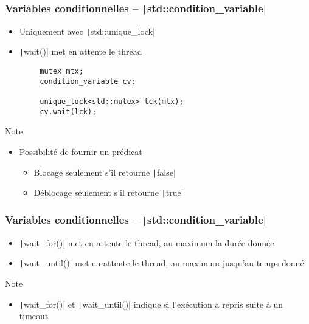 \documentclass[C++.tex]{subfiles}
\begin{document}
\begin{frame}[fragile]
	\frametitle{Variables conditionnelles -- \texttt|std::condition_variable|}
	\begin{itemize}
		\item Uniquement avec \texttt|std::unique_lock|
		\item \texttt|wait()| met en attente le thread
	\end{itemize}

	\begin{verbatim}
		mutex mtx;
		condition_variable cv;

		unique_lock<std::mutex> lck(mtx);
		cv.wait(lck);
	\end{verbatim}

	\begin{block}{Note}
		\begin{itemize}
			\item Possibilité de fournir un prédicat
			\begin{itemize}
				\item Blocage seulement s'il retourne \texttt|false|
				\item Déblocage seulement s'il retourne \texttt|true|
			\end{itemize}
		\end{itemize}
	\end{block}
\end{frame}

\begin{frame}[fragile]
	\frametitle{Variables conditionnelles -- \texttt|std::condition_variable|}
	\begin{itemize}
		\item \texttt|wait_for()| met en attente le thread, au maximum la durée donnée
		\item \texttt|wait_until()| met en attente le thread, au maximum jusqu'au temps donné
	\end{itemize}

	\begin{block}{Note}
		\begin{itemize}
			\item \texttt|wait_for()| et \texttt|wait_until()| indique si l'exécution a repris suite à un timeout
		\end{itemize}
	\end{block}
\end{frame}
\end{document}
